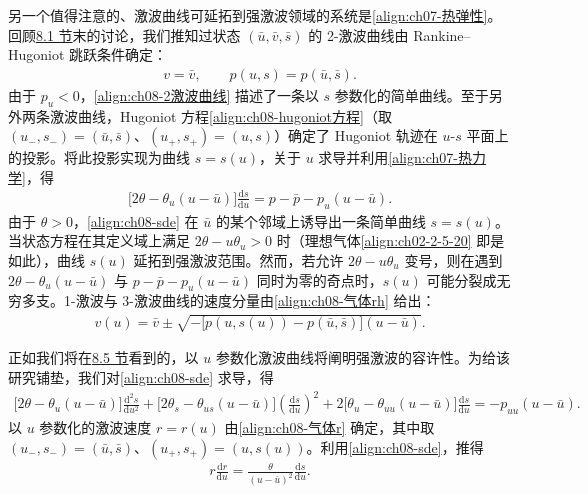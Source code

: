 \documentclass[../../main.tex]{subfiles}
\begin{document}
另一个值得注意的、激波曲线可延拓到强激波领域的系统是\eqref{align:ch07-热弹性}。回顾\hyperref[section:ch08-强激波弱激波中等强度激波]{8.1 节}末的讨论，我们推知过状态 $(\bar u,\bar v,\bar s)$ 的 2-激波曲线由 Rankine--Hugoniot 跳跃条件确定：
\begin{align}
v=\bar v,\qquad p(u,s)=p(\bar u,\bar s).
\label{align:ch08-2激波曲线}
\end{align}
由于 $p_u<0$，\eqref{align:ch08-2激波曲线} 描述了一条以 $s$ 参数化的简单曲线。至于另外两条激波曲线，Hugoniot 方程\eqref{align:ch08-hugoniot方程}（取 $(u_-,s_-)=(\bar u,\bar s)$、$(u_+,s_+)=(u,s)$）确定了 Hugoniot 轨迹在 $u$-$s$ 平面上的投影。将此投影实现为曲线 $s=s(u)$，关于 $u$ 求导并利用\eqref{align:ch07-热力学}，得
\begin{align}
\big[2\theta-\theta_u(u-\bar u)\big]\frac{\mathrm{d}s}{\mathrm{d}u}=p-\bar p-p_u(u-\bar u).
\label{align:ch08-sde}
\end{align}
由于 $\theta>0$，\eqref{align:ch08-sde} 在 $\bar u$ 的某个邻域上诱导出一条简单曲线 $s=s(u)$。当状态方程在其定义域上满足 $2\theta-u\theta_u>0$ 时（理想气体\eqref{align:ch02-2-5-20} 即是如此），曲线 $s(u)$ 延拓到强激波范围。然而，若允许 $2\theta-u\theta_u$ 变号，则在遇到 $2\theta-\theta_u(u-\bar u)$ 与 $p-\bar p-p_u(u-\bar u)$ 同时为零的奇点时，$s(u)$ 可能分裂成无穷多支。1-激波与 3-激波曲线的速度分量由\eqref{align:ch08-气体rh} 给出：
\begin{align}
v(u)=\bar v\pm\sqrt{-\big[p(u,s(u))-p(\bar u,\bar s)\big](u-\bar u)}.
\label{align:ch08-vu}
\end{align}

正如我们将在\hyperref[section:ch08-熵激波容许性准则]{8.5 节}看到的，以 $u$ 参数化激波曲线将阐明强激波的容许性。为给该研究铺垫，我们对\eqref{align:ch08-sde} 求导，得
\begin{align}
\big[2\theta-\theta_u(u-\bar u)\big]\frac{\mathrm{d}^2s}{\mathrm{d}u^2}
+\big[2\theta_s-\theta_{us}(u-\bar u)\big]\left(\frac{\mathrm{d}s}{\mathrm{d}u}\right)^2
+2\big[\theta_u-\theta_{uu}(u-\bar u)\big]\frac{\mathrm{d}s}{\mathrm{d}u}
=-p_{uu}(u-\bar u).
\label{align:ch08-sde2}
\end{align}
以 $u$ 参数化的激波速度 $r=r(u)$ 由\eqref{align:ch08-气体r} 确定，其中取 $(u_-,s_-)=(\bar u,\bar s)$、$(u_+,s_+)=(u,s(u))$。利用\eqref{align:ch08-sde}，推得
\begin{align}
r\frac{\mathrm{d}r}{\mathrm{d}u}=\frac{\theta}{(u-\bar u)^2}\frac{\mathrm{d}s}{\mathrm{d}u}.
\label{align:ch08-rdr}
\end{align}
\end{document}
